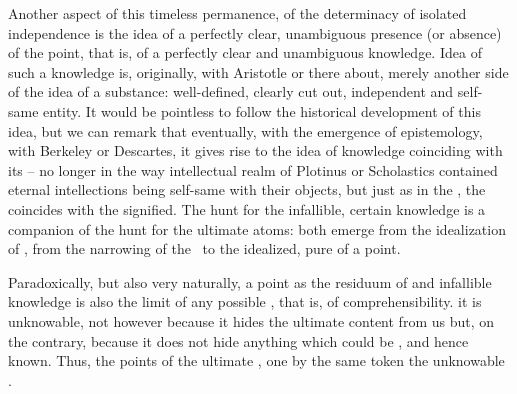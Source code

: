 Another aspect of this timeless permanence, of the
determinacy of isolated independence is the idea of a perfectly clear, unambiguous
presence (or absence) of the point, that is, of a perfectly clear and unambiguous
knowledge. Idea of such a knowledge is, originally, with Aristotle or
there about, merely another side of the idea of a substance: well-defined,
clearly cut out, independent and self-same entity. It would be pointless to
follow the historical development of this idea, but we can remark that
eventually, with the emergence of epistemology, with Berkeley or Descartes, it
gives rise to the idea of knowledge coinciding with its  -- no longer
in the way intellectual realm of Plotinus or Scholastics contained eternal
intellections being self-same with their objects, but just as in the
, the  coincides with the signified.
The hunt for the infallible, certain knowledge is a companion of the hunt for
the ultimate atoms: both emerge from the idealization of , from the narrowing of the \hoa\ to the idealized, pure
 of a point.


\pa\label{pa:pointUnknown}
Paradoxically, but also very naturally, a point  as the residuum of
 and infallible knowledge is also the limit of any possible
, that is, of comprehensibility.  it is
unknowable, not however because it hides the ultimate content from us but, on
the contrary, because it does not hide anything which could be
, and hence known. Thus,  the points of the
ultimate , one  by the same token the unknowable
. 

